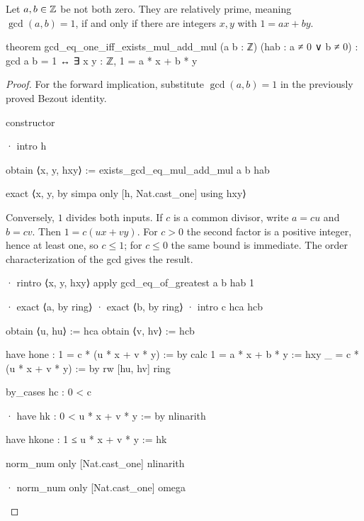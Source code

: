 \begin{theorem}
  \label{ent:thm:gcd-one-bezout}
  Let $a,b\in\mathbb{Z}$ be not both zero.
  They are relatively prime, meaning $\gcd(a,b)=1$, if and only if there are integers $x,y$ with
  $1=ax+by$.

  \begin{lean}
    theorem gcd_eq_one_iff_exists_mul_add_mul (a b : ℤ) (hab : a ≠ 0 ∨ b ≠ 0) :
        gcd a b = 1 ↔ ∃ x y : ℤ, 1 = a * x + b * y
  \end{lean}
\end{theorem}

\begin{proof}
  For the forward implication, substitute $\gcd(a,b)=1$ in the previously proved Bezout identity.

  \begin{lean}
    constructor

    · intro h

      obtain ⟨x, y, hxy⟩ := exists_gcd_eq_mul_add_mul a b hab

      exact ⟨x, y, by simpa only [h, Nat.cast_one] using hxy⟩
  \end{lean}
  Conversely, $1$ divides both inputs.
  If $c$ is a common divisor, write $a=cu$ and $b=cv$.
  Then $1=c(ux+vy)$.
  For $c>0$ the second factor is a positive integer, hence at least one, so $c\le1$; for $c\le0$
  the same bound is immediate.
  The order characterization of the gcd gives the result.

  \begin{lean}
    · rintro ⟨x, y, hxy⟩
      apply gcd_eq_of_greatest a b hab 1

      · exact ⟨a, by ring⟩
      · exact ⟨b, by ring⟩
      · intro c hca hcb

        obtain ⟨u, hu⟩ := hca
        obtain ⟨v, hv⟩ := hcb

        have hone : 1 = c * (u * x + v * y) := by
          calc
            1 = a * x + b * y := hxy
            _ = c * (u * x + v * y) := by
              rw [hu, hv]
              ring

        by_cases hc : 0 < c

        · have hk : 0 < u * x + v * y := by
            nlinarith

          have hkone : 1 ≤ u * x + v * y := hk

          norm_num only [Nat.cast_one]
          nlinarith

        · norm_num only [Nat.cast_one]
          omega
  \end{lean}
\end{proof}

